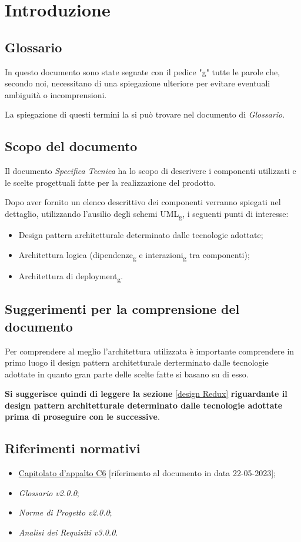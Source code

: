 \section{Introduzione}

\subsection{Glossario}
In questo documento sono state segnate con il pedice "g" tutte le parole che, secondo noi, necessitano di una spiegazione ulteriore per evitare
eventuali ambiguità o incomprensioni.

La spiegazione di questi termini la si può trovare nel documento di \textit{Glossario}. 

\subsection{Scopo del documento}
Il documento \textit{Specifica Tecnica} ha lo scopo di descrivere i componenti utilizzati e le scelte progettuali fatte per la realizzazione del prodotto.

Dopo aver fornito un elenco descrittivo dei componenti verranno spiegati nel dettaglio, utilizzando l'ausilio degli schemi UML\textsubscript{g}, i seguenti punti di interesse: 
\begin{itemize}
	\item Design pattern architetturale determinato dalle tecnologie adottate;
	\item Architettura logica (dipendenze\textsubscript{g} e interazioni\textsubscript{g} tra componenti);
	\item Architettura di deployment\textsubscript{g}.
\end{itemize}

\subsection{Suggerimenti per la comprensione del documento}
Per comprendere al meglio l'architettura utilizzata è importante comprendere in primo luogo il design pattern
architetturale derterminato dalle tecnologie adottate in quanto gran parte delle scelte fatte si basano su di esso.

\textbf{Si suggerisce quindi di leggere la sezione} \ref{design Redux} \textbf{riguardante il design pattern architetturale determinato 
dalle tecnologie adottate prima di proseguire con le successive}.

\subsection{Riferimenti normativi}
\begin{itemize}
\item \href{https://www.math.unipd.it/~tullio/IS-1/2022/Progetto/C6.pdf}{Capitolato d'appalto C6} [riferimento al documento in data 22-05-2023];
\item \textit{Glossario v2.0.0};
\item \textit{Norme di Progetto v2.0.0};
\item \textit{Analisi dei Requisiti v3.0.0}.
\end{itemize}
